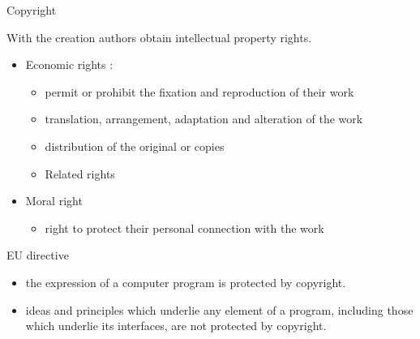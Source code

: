 \documentclass{beamer}
\begin{document}
\begin{frame}{Copyright}

With the creation authors obtain intellectual property rights.

  \begin{itemize}
  \item Economic rights :
    \begin{itemize}
    \item permit or prohibit the fixation and reproduction of their
      work
    \item translation, arrangement, adaptation and alteration of the
      work
    \item distribution of the original or copies
    \item Related rights
    \end{itemize}
  \item Moral right
    \begin{itemize}
    \item right to protect their personal connection with the work
    
    \end{itemize}
  \end{itemize}

 
  \begin{alertblock}{EU directive}
    \begin{itemize}
    \item the expression of a computer program is protected by
      copyright.
    \item ideas and principles which underlie any element of a
      program, including those which underlie its interfaces, are not
      protected by copyright.
    \end{itemize}

  \end{alertblock}

\end{frame}
\end{document}
